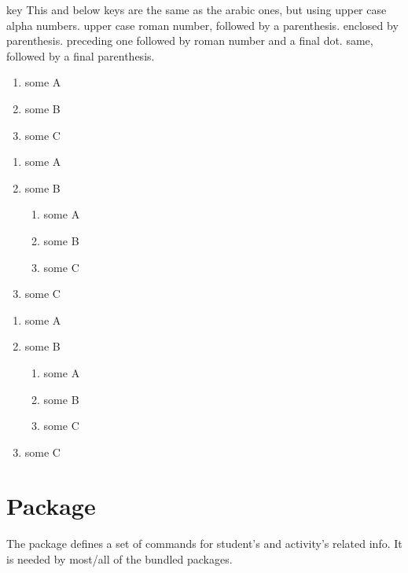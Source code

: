 \documentclass[article,nogeometry,english,tocdepth=3,secdepth=3]{ufrgscca} %
\begin{document}
\begin{describelist}{key}
	 { This and below keys are the same as the arabic ones, but using upper case alpha numbers.}
	 { upper case roman number, followed by a parenthesis.}
	 { enclosed by parenthesis.}
	 { preceding one followed by roman number and a final dot.}
	 { same, followed by a final parenthesis.}
	\begin{codestore}[st=enumC]
	\begin{enumerate}
		\item some A
		\item some B
		\item some C
	\end{enumerate}
	\begin{enumerate}
		\item some A
		\item some B
		\begin{enumerate}
			\item some A
			\item some B
			\item some C
		\end{enumerate}
		\item some C
	\end{enumerate}
	\begin{enumerate}
		\item some A
		\item some B
		\begin{enumerate}
			\item some A
			\item some B
			\item some C
		\end{enumerate}
		\item some C
	\end{enumerate}
\end{codestore}



\end{describelist}




\section{ Package}
The  package defines a set of commands for  student's and activity's related info. It is needed by most/all of the bundled packages.
\end{document}
